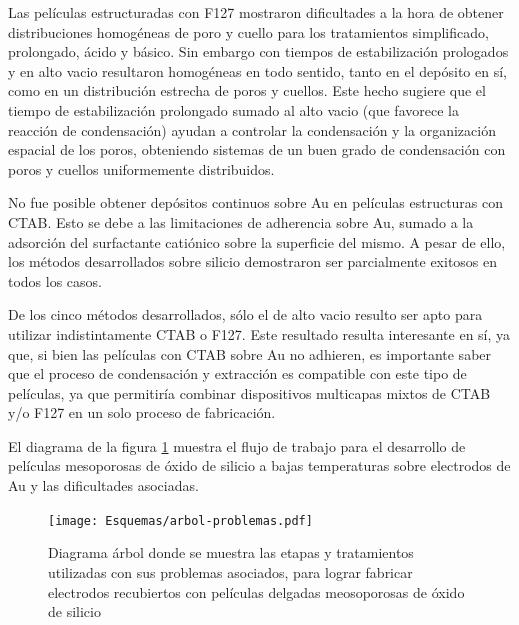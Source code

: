 	Las películas estructuradas con F127 mostraron dificultades a la hora de obtener distribuciones homogéneas de poro y cuello para los tratamientos simplificado, prolongado, ácido y básico. Sin embargo con tiempos de estabilización prologados y en alto vacio resultaron homogéneas en todo sentido, tanto en el depósito en sí, como en un distribución estrecha de poros y cuellos. Este hecho sugiere que el tiempo de estabilización prolongado sumado al alto vacio (que favorece la reacción de condensación) ayudan a controlar la condensación y la organización espacial de los poros, obteniendo sistemas de un buen grado de condensación con poros y cuellos uniformemente distribuidos.

	No fue posible obtener depósitos continuos sobre Au en películas estructuras con CTAB. Esto se debe a las limitaciones de adherencia sobre Au, sumado a la adsorción del surfactante catiónico sobre la superficie del mismo. A pesar de ello, los métodos desarrollados sobre silicio demostraron ser parcialmente exitosos en todos los casos.

	De los cinco métodos desarrollados, sólo el de alto vacio resulto ser apto para utilizar indistintamente CTAB o F127. Este resultado resulta interesante en sí, ya que, si bien las películas con CTAB sobre Au no adhieren, es importante saber que el proceso de condensación y extracción es compatible con este tipo de películas, ya que permitiría combinar dispositivos multicapas mixtos de CTAB y/o F127 en un solo proceso de fabricación.

	El diagrama de la figura \ref{fig:flujo-trabajo} muestra el flujo de trabajo para el desarrollo de películas mesoporosas de óxido de silicio a bajas temperaturas sobre electrodos de Au y las dificultades asociadas.

		\begin{figure}[!ht]
			\begin{center}
			\texttt{[image: Esquemas/arbol-problemas.pdf]}
			\caption[Flujo de trabajo para obtener electrodos con películas mesoporosa]{Diagrama árbol donde se muestra las etapas y tratamientos utilizadas con sus problemas asociados, para lograr fabricar electrodos recubiertos con películas delgadas meosoporosas de óxido de silicio}
			\label{fig:flujo-trabajo}
			\end{center}
			\end{figure}	
	
